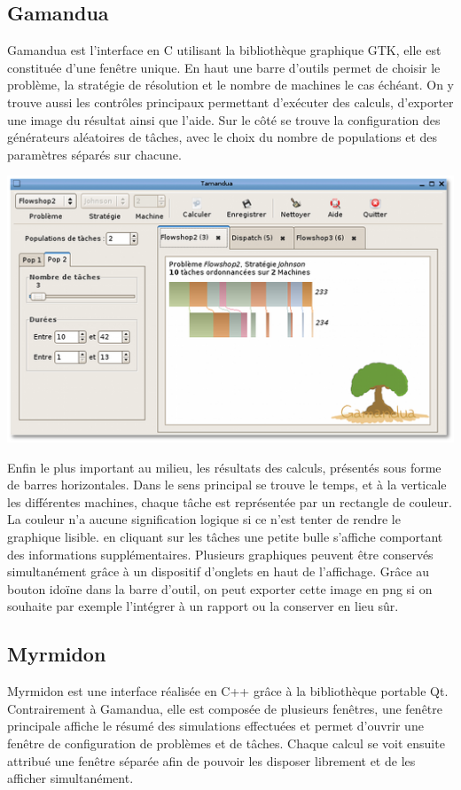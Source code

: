 \subsection{Gamandua}
Gamandua est l'interface en C utilisant la bibliothèque graphique GTK, elle est
constituée d'une fenêtre unique. En haut une barre d'outils permet de choisir 
le problème, la stratégie de résolution et le nombre de machines le cas échéant.
On y trouve aussi les contrôles principaux permettant d'exécuter des calculs,
d'exporter une image du résultat ainsi que l'aide. Sur le côté se trouve la
configuration des générateurs aléatoires de tâches, avec le choix du nombre
de populations et des paramètres séparés sur chacune.
\begin{center}
\includegraphics{gamandua.png}
\end{center}
Enfin le plus important au
milieu, les résultats des calculs, présentés sous forme de barres horizontales.
Dans le sens principal se trouve le temps, et à la verticale les différentes
machines, chaque tâche est représentée par un rectangle de couleur. La couleur
n'a aucune signification logique si ce n'est tenter de rendre le graphique
lisible. en cliquant sur les tâches une petite bulle s'affiche comportant des
informations supplémentaires. Plusieurs graphiques peuvent être conservés
simultanément grâce à un dispositif d'onglets en haut de l'affichage. Grâce au
bouton idoïne dans la barre d'outil, on peut exporter cette image en png si
on souhaite par exemple l'intégrer à un rapport ou la conserver en lieu sûr.
\subsection{Myrmidon}
Myrmidon est une interface réalisée en C++ grâce à la bibliothèque portable Qt.
Contrairement à Gamandua, elle est composée de plusieurs fenêtres, une fenêtre
principale affiche le résumé des simulations effectuées et permet d'ouvrir une
fenêtre de configuration de problèmes et de tâches. Chaque calcul se voit
ensuite attribué une fenêtre séparée afin de pouvoir les disposer librement et
de les afficher simultanément.

